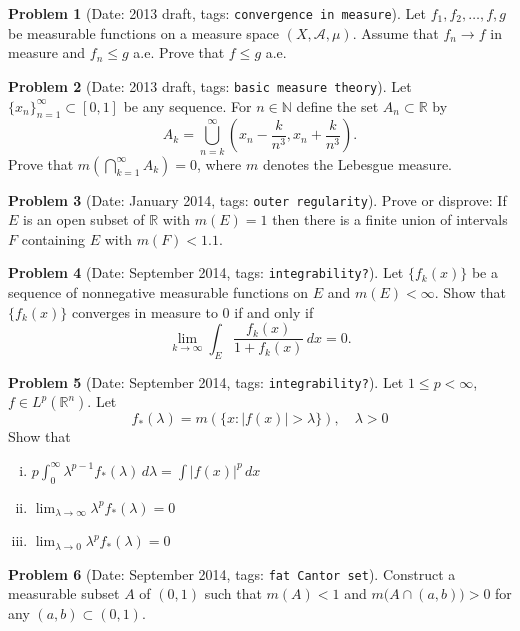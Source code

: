 \documentclass[11pt, notitlepage]{article}
\theoremstyle{definition}
\theoremstyle{definition}
\theoremstyle{definition}
\newtheorem{probstate}{Problem}
\theoremstyle{remark}
\newenvironment{problem}[2]{
    \begin{probstate}[Date: #1, tags: \texttt{#2}]
}
{
  \end{probstate}
}
\newcommand{\R}{\mathbb{R}}
\newcommand{\N}{\mathbb{N}}
\begin{document}
\begin{problem}{2013 draft}{convergence in measure}
Let $f_1, f_2, \ldots, f, g$ be measurable functions on a measure space  $(X, \mathcal{A},\mu)$. Assume that $f_n \to f$ in measure and $f_n \le g$ a.e. Prove that $f \le g$ a.e.
\end{problem}

\begin{problem}{2013 draft}{basic measure theory}
Let $\{x_n\}_{n=1}^{\infty} \subset [0,1]$ be any sequence. For $n \in \N$ define the set $A_n \subset \R$ by
  \[
   A_k=\bigcup_{n=k}^{\infty} \left(x_n-\frac{k}{n^3}, x_n+ \frac{k}{n^3} \right).
  \]
  Prove that $m(\bigcap_{k=1}^{\infty} A_k)=0$, where $m$ denotes the Lebesgue measure.
\end{problem}

\begin{problem}{January 2014}{outer regularity}
Prove or disprove:  If $E$ is an open subset of $\R$ with $m(E)=1$ then there is a finite union of intervals $F$ containing $E$ with $m(F)<1.1$.
\end{problem}

\begin{problem}{September 2014}{integrability?}
Let $\{f_k(x)\}$ be a sequence of nonnegative measurable functions on $E$ and $m(E)<\infty$. Show that $\{f_k(x)\}$ converges in measure to $0$ if and only if
$$\lim_{k\to\infty}\int_E\frac{f_k(x)}{1+f_k(x)}\,dx=0.$$
\end{problem}

\begin{problem}{September 2014}{integrability?}
Let $1\le p<\infty$, $f\in L^p(\mathbb R^n)$. Let
$$f_*(\lambda)=m(\{x: |f(x)|>\lambda\}), \quad \lambda>0$$
Show that

\begin{enumerate}[(i)]
\item$p\int_0^\infty \lambda^{p-1} f_*(\lambda)\,d\lambda= \int |f(x)|^p\,dx$
\item  $\lim_{\lambda\to\infty}\lambda^p f_*(\lambda)=0$
\item $\lim_{\lambda\to 0}\lambda^p f_*(\lambda)=0$
\end{enumerate}
\end{problem}

\begin{problem}{September 2014}{fat Cantor set}
Construct a measurable subset $A$ of $(0,1)$ such that $m(A)<1$ and
 $m \big(A \cap (a,b) \big) >0$ for any $(a,b) \subset (0,1)$.
\end{problem}
\end{document}
